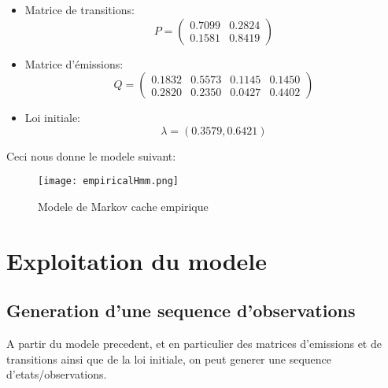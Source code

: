 \documentclass{article}
\begin{document}
\begin{multicols}{2}
\begin{itemize}
    \item Matrice de transitions:
        \begin{equation}\label{eq:trans}
            P =
            \begin{pmatrix*}
                0.7099 & 0.2824 \\
                0.1581 & 0.8419
            \end{pmatrix*}
        \end{equation}

    \item Matrice d'émissions:
        \begin{equation}\label{eq:emis}
            Q =
            \begin{pmatrix*}
                0.1832 & 0.5573 & 0.1145 & 0.1450 \\
                0.2820 & 0.2350 & 0.0427 & 0.4402
            \end{pmatrix*}
        \end{equation}

    \item Loi initiale:
        \begin{equation}\label{eq:init}
            \lambda = (0.3579, 0.6421)
        \end{equation}
\end{itemize}

Ceci nous donne le modele suivant:

\begin{figure}[H]
    \begin{center}
        \texttt{[image: empiricalHmm.png]}
        \centering
        \captionsetup{justification=centering}
        \caption{\label{fig:empiricalHmm}Modele de Markov cache empirique}
    \end{center}
\end{figure}

\section{Exploitation du modele}\label{sec:exploit}

\subsection{Generation d'une sequence d'observations}

A partir du modele precedent, et en particulier des matrices d'emissions et de
transitions ainsi que de la loi initiale, on peut generer une sequence
d'etats/observations.


\end{multicols}
\end{document}
